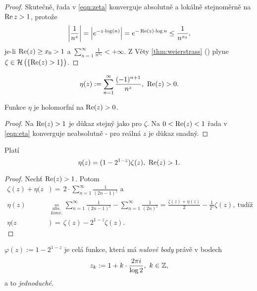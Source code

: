 \begin{proof}
Skutečně, řada v \cref{eqn:zeta} konverguje absolutně a lokálně stejnoměrně na $\operatorname{Re} z>1$, protože $$\left|\frac{1}{n^z}\right|=\left|e^{-z\cdot \log(n)}\right|=e^{-\operatorname{Re}(z)\cdot\log n}\leq\frac{1}{n^{x_0}},$$ 
je-li $\operatorname{Re} (z)\geq x_0>1$ a $\sum_{n=1}^\infty\frac{1}{n^{x_0}}<+\infty$. Z Věty \cref{thm:weierstrass} () plyne\\ $\zeta\in\operatorname{\mathcal{H}}\big(\{\operatorname{Re}(z)>1\}\big)$.
\end{proof}

\begin{definition}
\begin{equation}\label{eqn:eta}
    \eta(z):=\sum_{n=1}^\infty \frac{(-1)^{n+1}}{n^z},\ \Rel(z)>0.
\end{equation}
\end{definition}

\begin{lemma}
Funkce $\eta$ je holomorfní na $\operatorname{Re}(z)>0$.
\end{lemma}

\begin{proof}
Na $\operatorname{Re}(z)>1$ je důkaz stejný jako pro $\zeta$. Na $0<\operatorname{Re}(z)<1$ řada v \cref{eqn:eta} konverguje neabsolutně - pro reálná $z$ je důkaz snadný.
\end{proof}

\begin{lemma}\label{lemma:etaZetaRelation} Platí
\begin{equation*}
    \eta(z)=(1-2^{1-z})\zeta(z),\ \Rel(z)>1.
\end{equation*}
\end{lemma}

\begin{proof}
Nechť $\operatorname{Re}(z)>1$. Potom \begin{align*}
    \zeta(z)+\eta(z&)\,=\,2\cdot\sum_{n=1}^\infty \frac{1}{(2n-1)^z} \text{ a}\\
    \eta(z)&\underset{konv.}{\underset{abs.}{=}}\sum_{n=1}^\infty \frac{1}{(2n-1)^z}-\sum_{n=1}^\infty\frac{1}{(2n)^z}=\frac{\zeta(z)+\eta(z)}{2}-\frac{1}{2^z}\zeta(z),\ \text{tudíž}\\
    \eta(z&)\,=\,\zeta(z)-2^{1-z}\zeta(z).
\end{align*}
\end{proof}

\begin{lemma}
$\varphi(z):=1-2^{1-z}$ je celá funkce, která má \emph{nulové body} právě v bodech $$z_k:=1+k\cdot\frac{2\pi i}{\log 2},\ k\in \operatorname{\mathbb{Z}},$$ a to \emph{jednoduché}.
\end{lemma}

